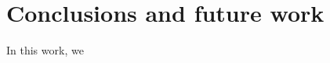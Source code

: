 \documentclass[../main.tex]{subfiles}
\begin{document}
\chapter{Conclusions and future work}
\label{ch:conclusion}

In this work, we
\end{document}
